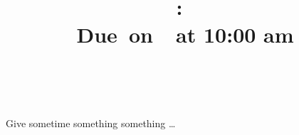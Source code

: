 \documentclass[]{article}
\title{
    \vspace{2in}
    \textmd{\textbf{\hmwkClass:\ \hmwkTitle}}\\
    \normalsize\vspace{0.1in}\small{Due\ on\ \hmwkDueDate\ at 10:00 am}\\
    \vspace{0.1in}\large{\textit{\hmwkClassInstructor\ \hmwkClassTime}}
    \vspace{3in}
}
\author{\hmwkAuthorName}
\date{}
\begin{document}
\maketitle
\newpage

\begin{homeworkProblem}
  Give sometime something something \ldots
\end{homeworkProblem}
\end{document}
